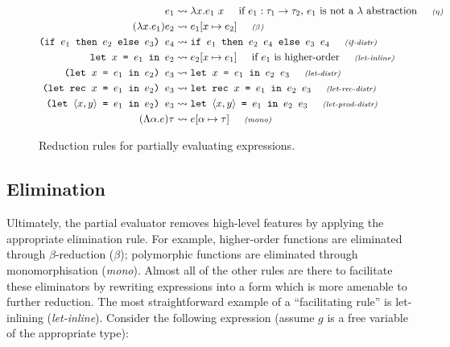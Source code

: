 \documentclass[runningheads]{llncs}
\begin{document}
\begin{figure*}[h]

  \begin{minipage}[c]{\textwidth}
    \begin{align*}
      e_1 &\leadsto \lambda x. e_1\ x \hskip 0.5cm \text{if $e_1 : \tau_1 \rightarrow \tau_2$, $e_1$ is not a $\lambda$ abstraction} \textit{\hskip 0.5cm\scriptsize ($\eta$)}\\
      (\lambda x. e_1) e_2 &\leadsto e_1[x \mapsto e_2]  \textit{\hskip 0.5cm\scriptsize ($\beta$)}\\
      \texttt{(if $e_1$ then $e_2$ else $e_3$) $e_4$} &\leadsto \texttt{if $e_1$ then $e_2$ $e_4$ else $e_3$ $e_4$}\textit{\hskip 0.5cm\scriptsize (if-distr)} \\
      \texttt{let $x$ = $e_1$ in $e_2$} &\leadsto e_2[x \mapsto e_1] \hskip 0.5cm \text{if $e_1$ is higher-order} \textit{\hskip 0.5cm\scriptsize (let-inline)} \\
      \texttt{(let $x$ = $e_1$ in $e_2$) $e_3$} &\leadsto \texttt{let $x$ = $e_1$ in $e_2$ $e_3$}\textit{\hskip 0.5cm\scriptsize (let-distr)} \\
      \texttt{(let rec $x$ = $e_1$ in $e_2$) $e_3$} &\leadsto \texttt{let rec $x$ = $e_1$ in $e_2$ $e_3$}\textit{\hskip 0.5cm\scriptsize (let-rec-distr)} \\
      \texttt{(let $\langle x , y \rangle$ = $e_1$ in $e_2$) $e_3$} &\leadsto \texttt{let $\langle x , y \rangle$ = $e_1$ in $e_2$ $e_3$}\textit{\hskip 0.5cm\scriptsize (let-prod-distr)} \\
      (\Lambda \alpha. e) \tau &\leadsto e[\alpha \mapsto \tau] \textit{\hskip 0.5cm\scriptsize (mono)}
    \end{align*}
  \end{minipage}

  \caption{Reduction rules for partially evaluating expressions.}
  \label{fig:pe-expr-rules}
\end{figure*}

\subsection{Elimination}

Ultimately, the partial evaluator removes high-level features by applying the appropriate elimination rule. For example, higher-order functions are eliminated through $\beta$-reduction (\textit{\scriptsize $\beta$}); polymorphic functions are eliminated through monomorphisation (\textit{\scriptsize mono}). Almost all of the other rules are there to facilitate these eliminators by rewriting expressions into a form which is more amenable to further reduction. The most straightforward example of a ``facilitating rule'' is let-inlining (\textit{\scriptsize let-inline}). Consider the following expression (assume $g$ is a free variable of the appropriate type):
\end{document}
